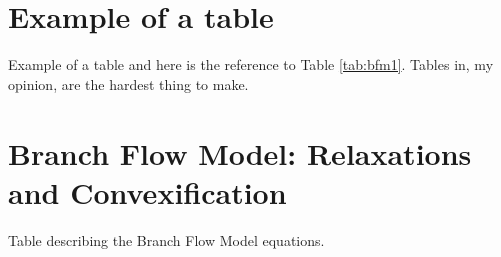 \appendix

\makeatletter
\renewcommand{\@makechapterhead}[1]{\vspace *{-10\p@ }{\parindent \z@ 
\raggedright \normalfont \ifnum \c@secnumdepth >\m@ne \Huge \bfseries 
\@chapapp \space \thechapter \vskip 10\p@ \fi #1\par \nobreak \vskip 30\p@ }}
\makeatother

\chapter{Example of a table}
Example of a table and here is the reference to Table \ref{tab:bfm1}. Tables in, my opinion, are the hardest thing to make.

\chapter{Branch Flow Model: Relaxations and Convexification}
\begin{table}[!h]
	\caption{Table describing the Branch Flow Model equations.}
	\label{tab:bfm1}
	\centering
	\hspace*{-2cm}
	
\end{table}

